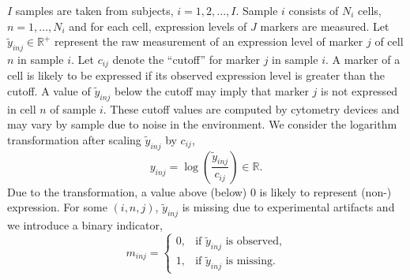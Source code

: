 \documentclass[12pt,]{article}
\providecommand{\tightlist}{%
  \setlength{\itemsep}{0pt}\setlength{\parskip}{0pt}}
\newcommand{\p}[1]{\left(#1\right)}
\begin{document}
$I$ samples are taken from subjects, \(i = 1,2,...,I\). Sample \(i\) consists
of \(N_i\) cells, \(n=1, \ldots, N_i\) and for each cell, expression levels of
\(J\) markers are measured. Let \(\tilde{y}_{inj} \in \mathbb{R}^+\) represent
the raw measurement of an expression level of marker \(j\) of cell \(n\) in
sample \(i\). Let \(c_{ij}\) denote the ``cutoff'' for marker \(j\) in sample
\(i\). A marker of a cell is likely to be expressed if its observed expression
level is greater than the cutoff. A value of $\tilde{y}_{inj}$ below the cutoff
may imply that marker $j$ is not expressed in cell $n$ of sample $i$. 
These cutoff values are computed by cytometry devices and may vary by sample
due to noise in the environment.  We consider the logarithm transformation
after scaling \(\tilde{y}_{inj}\) by
$c_{ij}$, 
$$
y_{inj}=\log\p{\frac{\tilde{y}_{inj}}{c_{ij}}} \in \mathbb{R}.
$$
Due to the transformation, a value above (below) 0 is likely to represent
(non-) expression. For some \((i, n, j)\), \(\tilde{y}_{inj}\) is missing due to
experimental artifacts and we introduce a binary indicator, 
$$
m_{inj} =
\begin{cases}
  0, & \text{if $\tilde{y}_{inj}$ is observed,} \\
  1, & \text{if $\tilde{y}_{inj}$ is missing.}
\end{cases}
$$


\def\labelenumi{\arabic{enumi}.}

\end{document}

